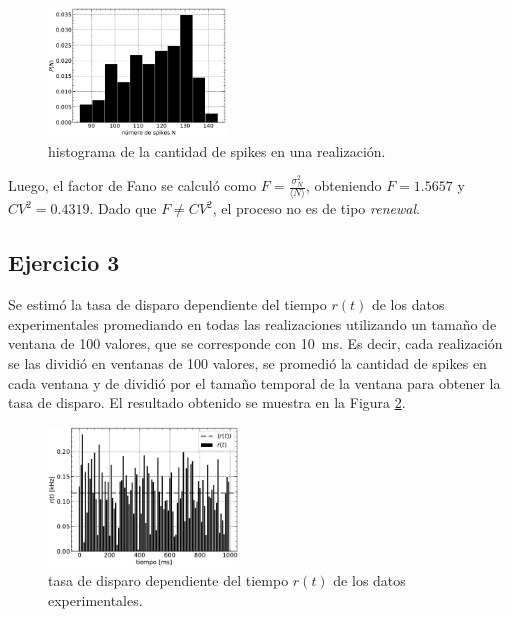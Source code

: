 \documentclass[11pt, twocolumn]{article}
\begin{document}
\begin{figure} [htbp]
    \centering
    \includegraphics[width=0.42\textwidth]{figures/spikes_count.pdf}
    \caption{histograma de la cantidad de spikes en una realización.}
    \label{fig:histogram_Nspikes}
\end{figure}


Luego, el factor de Fano se calculó como \(F = \frac{\sigma^2_N}{\langle N \rangle}\), obteniendo \(F = 1.5657\) y \(CV^2 = 0.4319\). Dado que \(F \neq CV^2\), el proceso no es de tipo \textit{renewal}.

\subsection*{Ejercicio 3}
Se estimó la tasa de disparo dependiente del tiempo \(r(t)\) de los datos experimentales promediando en todas las realizaciones utilizando un tamaño de ventana de 100 valores, que se corresponde con \SI{10}{\milli\second}. Es decir, cada realización se las dividió en ventanas de 100 valores, se promedió la cantidad de spikes en cada ventana y de dividió por el tamaño temporal de la ventana para obtener la tasa de disparo. El resultado obtenido se muestra en la Figura \ref{fig:rate}.


\begin{figure} [htbp]
    \centering
    \includegraphics[width=0.45\textwidth]{figures/rate.pdf}
    \caption{tasa de disparo dependiente del tiempo \(r(t)\) de los datos experimentales.}
    \label{fig:rate}
\end{figure}
\end{document}
